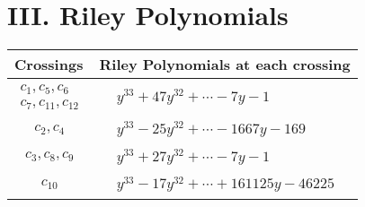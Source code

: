 \documentclass[1p]{elsarticle_modified}
\theoremstyle{definition}
\begin{document}
\centering \section*{ III. Riley Polynomials}
\begin{tabular}{m{50pt}|m{274pt}}
Crossings & \hspace{64pt}Riley Polynomials at each crossing \\
\hline $$\begin{aligned}c_{1},c_{5},c_{6}\\c_{7},c_{11},c_{12}\end{aligned}$$&$\begin{aligned}
&y^{33}+47 y^{32}+\cdots-7 y-1
\end{aligned}$\\
\hline $$\begin{aligned}c_{2},c_{4}\end{aligned}$$&$\begin{aligned}
&y^{33}-25 y^{32}+\cdots-1667 y-169
\end{aligned}$\\
\hline $$\begin{aligned}c_{3},c_{8},c_{9}\end{aligned}$$&$\begin{aligned}
&y^{33}+27 y^{32}+\cdots-7 y-1
\end{aligned}$\\
\hline $$\begin{aligned}c_{10}\end{aligned}$$&$\begin{aligned}
&y^{33}-17 y^{32}+\cdots+161125 y-46225
\end{aligned}$\\
\hline
\end{tabular}
\vskip 2pc
\end{document}
